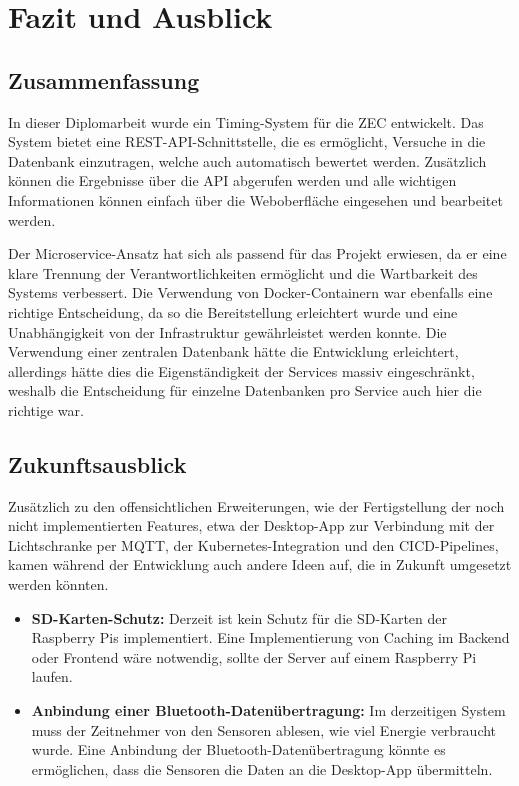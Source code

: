 \section{Fazit und Ausblick}
\subsection{Zusammenfassung}
In dieser Diplomarbeit wurde ein Timing-System für die \gls{ZEC} entwickelt. Das System bietet eine REST-\gls{API}-Schnittstelle, die es
ermöglicht, Versuche in die Datenbank einzutragen, welche auch automatisch bewertet werden. Zusätzlich können die Ergebnisse über die \gls{API} 
abgerufen werden und alle wichtigen Informationen können einfach über die Weboberfläche eingesehen und bearbeitet werden. 

Der Microservice-Ansatz hat sich als passend für das Projekt erwiesen, da er eine klare Trennung der Verantwortlichkeiten ermöglicht und die Wartbarkeit des Systems verbessert.
Die Verwendung von Docker-Containern war ebenfalls eine richtige Entscheidung, da so die Bereitstellung erleichtert wurde und eine Unabhängigkeit von der 
Infrastruktur gewährleistet werden konnte. Die Verwendung einer zentralen Datenbank hätte die Entwicklung erleichtert, allerdings hätte dies die 
Eigenständigkeit der Services massiv eingeschränkt, weshalb die Entscheidung für einzelne Datenbanken pro Service auch hier die richtige war.

\subsection{Zukunftsausblick}

Zusätzlich zu den offensichtlichen Erweiterungen, wie der Fertigstellung der noch nicht implementierten Features, etwa der Desktop-App zur Verbindung mit 
der Lichtschranke per MQTT, der Kubernetes-Integration und den \gls{CICD}-Pipelines, kamen während der Entwicklung auch andere Ideen auf, die in Zukunft umgesetzt werden könnten.

\begin{itemize}
    \item \textbf{SD-Karten-Schutz: } Derzeit ist kein Schutz für die SD-Karten der Raspberry Pis implementiert. Eine Implementierung von Caching im Backend oder Frontend
    wäre notwendig, sollte der Server auf einem Raspberry Pi laufen.
    \item \textbf{Anbindung einer Bluetooth-Datenübertragung: } Im derzeitigen System muss der Zeitnehmer von den Sensoren ablesen, wie viel Energie verbraucht wurde.
    Eine Anbindung der Bluetooth-Datenübertragung könnte es ermöglichen, dass die Sensoren die Daten an die Desktop-App übermitteln.
    
\end{itemize}
